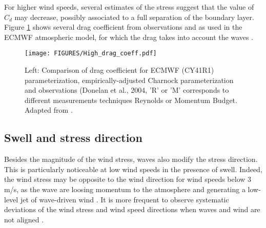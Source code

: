 For higher wind speeds, several estimates of the stress suggest that the value of $C_d$ may decrease, possibly associated to a full separation of the boundary layer. Figure \ref{Lucia2017} shows several drag coefficient from observations and as used in the ECMWF atmospheric model, for which the drag takes into account the waves \citep{Janssen2004}. %
\begin{figure}[h]
\centerline{\texttt{[image: FIGURES/High\_drag\_coeff.pdf]}}
  \caption{Left: Comparison of drag coefficient for ECMWF (CY41R1) parameterization, empirically-adjusted Charnock parameterization and observations (Donelan et al., 2004, 'R' or 'M' corresponds to different measurements techniques Reynolds or Momentum Budget. %
  Adapted from \cite{Pineau-Guillou&al.2018}.}
\label{Lucia2017}
\end{figure}

\subsection{Swell and stress direction}
Besides the magnitude of the wind stress, waves also modify the stress direction. This is particularly noticeable at low wind speeds in the presence of swell. Indeed, the wind stress may be opposite to the wind direction for wind speeds below 3 m/s, as the wave are loosing momentum to the atmosphere and generating a low-level jet of wave-driven wind \citep{Semedo&al.2009,Hogstrom&al.2009}. It is more frequent to observe systematic deviations of the wind stress and wind speed directions when waves and wind are not aligned \citep{Potter&al.2015}. 

